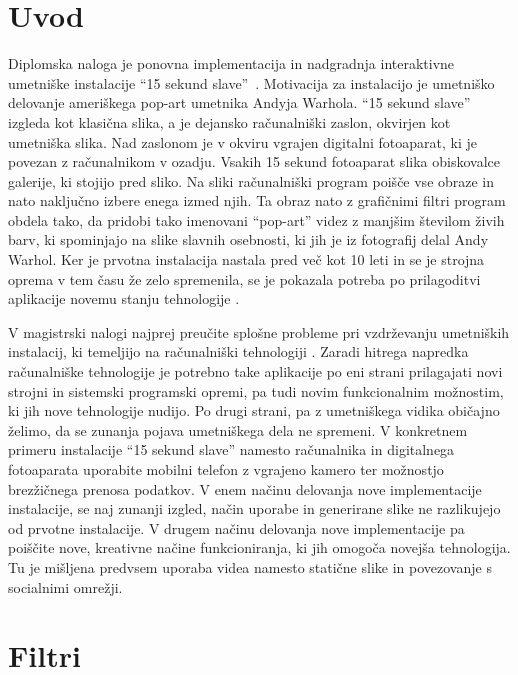 \chapter{Uvod}
Diplomska naloga je ponovna implementacija in nadgradnja interaktivne umetniške instalacije ``15 sekund slave''~\cite{15secLeonardo}. Motivacija za instalacijo je umetniško delovanje ameriškega pop-art umetnika Andyja Warhola. ``15 sekund slave'' izgleda kot klasična slika, a je dejansko računalniški zaslon, okvirjen kot umetniška slika. Nad zaslonom je v okviru vgrajen digitalni fotoaparat, ki je povezan z računalnikom v ozadju. Vsakih 15 sekund fotoaparat slika obiskovalce galerije, ki stojijo pred sliko. Na sliki računalniški program poišče vse obraze in nato naključno izbere enega izmed njih. Ta obraz nato z grafičnimi filtri program obdela tako, da pridobi tako imenovani ``pop-art'' videz z manjšim številom živih barv, ki spominjajo na slike slavnih osebnosti, ki jih je iz fotografij delal Andy Warhol. Ker je prvotna instalacija nastala pred več kot 10 leti in se je strojna oprema v tem času že zelo spremenila, se je pokazala potreba po prilagoditvi aplikacije novemu stanju tehnologije \cite{trifonova}.

V magistrski nalogi najprej preučite splošne probleme pri vzdrževanju umetniških instalacij, ki temeljijo na računalniški tehnologiji \cite{miller1,miller2,digitalartconservation}. Zaradi hitrega napredka računalniške tehnologije je potrebno take aplikacije po eni strani prilagajati novi strojni in sistemski programski opremi, pa tudi novim funkcionalnim možnostim, ki jih nove tehnologije nudijo. Po drugi strani, pa z umetniškega vidika običajno želimo, da se zunanja pojava umetniškega dela ne spremeni. V konkretnem primeru instalacije ``15 sekund slave'' namesto računalnika in digitalnega fotoaparata uporabite mobilni telefon z vgrajeno kamero ter možnostjo brezžičnega prenosa podatkov. V enem načinu delovanja nove implementacije instalacije, se naj zunanji izgled, način uporabe in generirane slike ne razlikujejo od prvotne instalacije. V drugem načinu delovanja nove implementacije pa poiščite nove, kreativne načine funkcioniranja, ki jih omogoča novejša tehnologija. Tu je mišljena predvsem uporaba videa namesto statične slike in povezovanje s socialnimi omrežji.




\chapter{Filtri}

